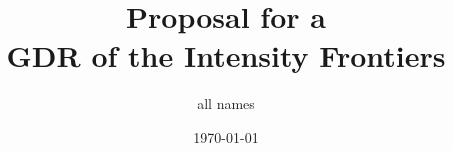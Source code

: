 \documentclass{article}
\title{Proposal for a \\ GDR of the Intensity Frontiers } %
\author{ all names } %
\date{\today} %
\begin{document}
\maketitle %

\begin{center}
\begin{tabular}{l r}
\end{tabular}
\end{center}



\linenumbers























\end{document}
